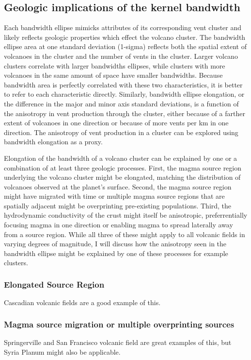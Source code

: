 \documentclass[12pt,letter]{article}
\begin{document}
\subsection{Geologic implications of the kernel bandwidth}
Each bandwidth ellipse mimicks attributes of its corresponding vent cluster and likely reflects geologic properties which effect the volcano cluster. The bandwidth ellipse area at one standard deviation (1-sigma) reflects both the spatial extent of volcanoes in the cluster and the number of vents in the cluster. Larger volcano clusters correlate with larger bandwidths ellipses, while clusters with more volcanoes in the same amount of space have smaller bandwidths. Because bandwidth area is perfectly correlated with these two characteristics, it is better to refer to each characteristic directly. Similarly, bandwidth ellipse elongation, or the difference in the major and minor axis standard deviations, is a function of the anisotropy in vent production through the cluster, either because of a farther extent of volcanoes in one direction or because of more vents per km in one direction. The anisotropy of vent production in a cluster can be explored using bandwidth elongation as a proxy.

Elongation of the bandwidth of a volcano cluster can be explained by one or a combination of at least three geologic processes. First, the magma source region underlying the volcano cluster might be elongated, matching the distribution of volcanoes observed at the planet's surface. Second, the magma source region might have migrated with time or multiple magma source regions that are spatially adjacent might be overprinting pre-existing populations. Third, the hydrodynamic conductivity of the crust might itself be anisotropic, preferrentially focusing magma in one direction or enabling magma to spread laterally away from a source region. While all three of these might apply to all volcanic fields in varying degrees of magnitude, I will discuss how the anisotropy seen in the bandwidth ellipse might be explained by one of these processes for example clusters.

\subsubsection{Elongated Source Region}
Cascadian volcanic fields are a good example of this.

\subsubsection{Magma source migration or multiple overprinting sources}
Springerville and San Francisco volcanic field are great examples of this, but Syria Planum might also be applicable.
\end{document}

